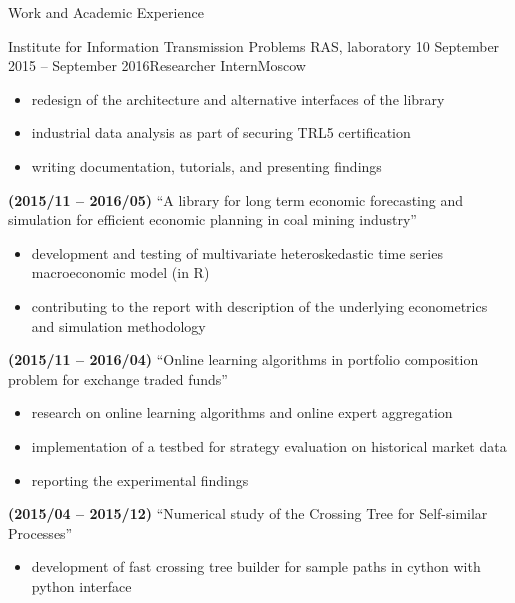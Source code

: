 \documentclass{resume} %
\begin{document}
\begin{rSection}{Work and Academic Experience}
\begin{rSubsection}{
        Institute for Information Transmission Problems RAS, laboratory 10
    }{September 2015 -- September 2016}{Researcher Intern}{Moscow}
\begin{itemize}
        \item redesign of the architecture and alternative interfaces of the library

        \item industrial data analysis as part of securing TRL5 certification

        \item writing documentation, tutorials, and presenting findings
    \end{itemize}

    \item \textbf{(2015/11 -- 2016/05)}
    ``A library for long term economic forecasting and simulation for efficient economic planning in coal mining industry''
    \begin{itemize}
        \item development and testing of multivariate heteroskedastic time series macroeconomic model (in R)

        \item contributing to the report with description of the underlying econometrics and simulation methodology
    \end{itemize}

    \item \textbf{(2015/11 -- 2016/04)}
    ``Online learning algorithms in portfolio composition problem for exchange traded funds''
    \begin{itemize}
        \item research on online learning algorithms and online expert aggregation

        \item implementation of a testbed for strategy evaluation on historical market data

        \item reporting the experimental findings
    \end{itemize}

    \item \textbf{(2015/04 -- 2015/12)}
    ``Numerical study of the Crossing Tree for Self-similar Processes''
    \begin{itemize}
        \item development of fast crossing tree builder for sample paths in cython with python interface


\end{itemize}
\end{rSubsection}
\end{rSection}
\end{document}

